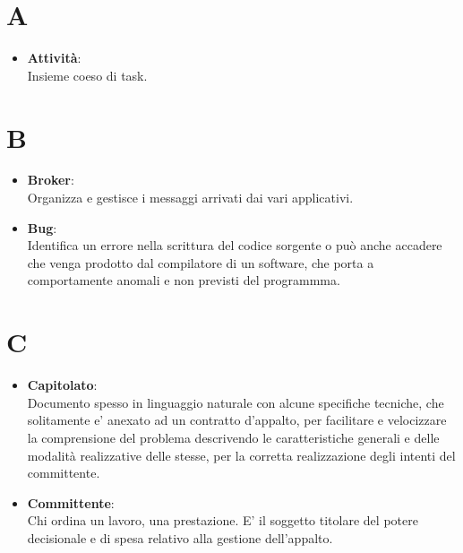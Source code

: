 \documentclass[a4paper, oneside, openany, dvipsnames, table]{article}
\begin{document}
\copertina{}


\newpage
\tableofcontents
\newpage

\newpage
\section{A}
\begin{itemize}
\item  \textbf{Attività}:\\	Insieme coeso di task.
\end{itemize}

\newpage
\section{B}
\begin{itemize}
\item \textbf{Broker}:\\	 Organizza e gestisce i messaggi arrivati dai vari applicativi.
\end{itemize}

\begin{itemize}
\item \textbf{Bug}:\\	Identifica un errore nella scrittura del codice sorgente o può anche accadere che venga prodotto dal compilatore di un software, che porta a comportamente anomali e non previsti del programmma.
\end{itemize}


\newpage
\section{C}
\begin{itemize}
\item \textbf{Capitolato}:\\	Documento  spesso in linguaggio naturale con alcune specifiche tecniche, che solitamente e' anexato ad un contratto  d’appalto,  per facilitare e velocizzare la comprensione del problema descrivendo le caratteristiche generali  e delle modalità realizzative delle stesse, per la corretta realizzazione degli intenti del committente.
\end{itemize}

\begin{itemize}
\item \textbf{Committente}:\\	Chi ordina un lavoro, una prestazione. E' il soggetto titolare del potere decisionale e di spesa relativo alla gestione dell'appalto.
\end{itemize}
\end{document}
